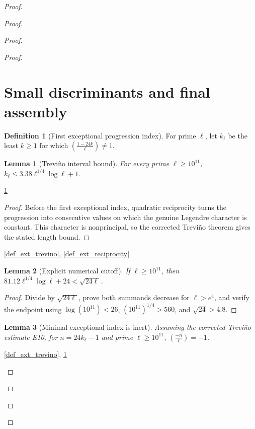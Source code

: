 \documentclass[11pt,a4paper]{article}
\numberwithin{equation}{section}
\theoremstyle{plain}\newtheorem{theorem}{Theorem}[section]\newaliascnt{proposition}{theorem}\newtheorem{proposition}[proposition]{Proposition}\aliascntresetthe{proposition}\newaliascnt{lemma}{theorem}\newtheorem{lemma}[lemma]{Lemma}\aliascntresetthe{lemma}
\theoremstyle{definition}\newaliascnt{definition}{theorem}\newtheorem{definition}[definition]{Definition}\aliascntresetthe{definition}\newaliascnt{notation}{theorem}\newtheorem{notation}[notation]{Notation}\aliascntresetthe{notation}
\providecommand{\lean}[1]{}\providecommand{\leanok}{}
\begin{document}
\begin{proof}
\begin{proof}
\begin{proof}
\begin{proof}
\section{Small discriminants and final assembly}
\begin{definition}[First exceptional progression index]\label{def_first_nonresidue}\lean{SptCM.firstNonresidue}\leanok
For prime $\ell$, let $k_\ell$ be the least $k\ge1$ for which $\left(\frac{1-24k}{\ell}\right)\ne1$.
\end{definition}
\begin{lemma}[Treviño interval bound]\label{lem_first_nonresidue_bound}\lean{SptCM.Repair.firstNonresidue_bound_of_E10}\leanok
For every prime $\ell\ge10^{11}$, $k_\ell\le3.38\ell^{1/4}\log\ell+1$.
\end{lemma}
\begin{uses-statement}\ref{def_first_nonresidue}\end{uses-statement}
\begin{proof}
Before the first exceptional index, quadratic reciprocity turns the progression into consecutive values on which the genuine Legendre character is constant.  This character is nonprincipal, so the corrected Treviño theorem gives the stated length bound.
\end{proof}
\begin{uses-proof}\ref{def_ext_trevino}, \ref{def_ext_reciprocity}\end{uses-proof}
\begin{lemma}[Explicit numerical cutoff]\label{lem_numeric_cutoff}\lean{SptCM.numeric_cutoff}\leanok
If $\ell\ge10^{11}$, then $81.12\ell^{1/4}\log\ell+24<\sqrt{24\ell}$.
\end{lemma}
\begin{proof}
Divide by $\sqrt{24\ell}$, prove both summands decrease for $\ell>e^4$, and verify the endpoint using $\log(10^{11})<26$, $(10^{11})^{1/4}>560$, and $\sqrt{24}>4.8$.
\end{proof}
\begin{lemma}[Minimal exceptional index is inert]\label{lem_minimal_inert}\lean{SptCM.Repair.minimalExceptionalIndex_inert}\leanok
Assuming the corrected Treviño estimate E10, for
$n=24k_\ell-1$ and prime $\ell\ge10^{11}$,
$\left(\frac{-n}{\ell}\right)=-1$.
\end{lemma}
\begin{uses-statement}\ref{def_ext_trevino}, \ref{def_first_nonresidue}\end{uses-statement}

\end{proof}
\end{proof}
\end{proof}
\end{proof}
\end{document}
